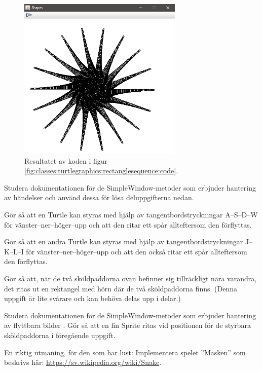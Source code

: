 \begin{figure}[H]
\centering
\includegraphics[width=0.7\textwidth, height = 0.3\pdfpageheight,keepaspectratio]{../img/w06-lab/RectangleSequence.png}
\caption {Resultatet av koden i figur \ref{fig:classes:turtlegraphics:rectanglesequence:code}.}
\label{fig:classes:turtlegraphics:rectanglesequence}

\end{figure}


\Task Studera dokumentationen för de SimpleWindow-metoder som erbjuder hantering av händelser  och använd dessa för lösa deluppgifterna nedan.

\Subtask Gör så att en Turtle kan styras med hjälp av tangentbordstryckningar A--S--D--W för vänster--ner--höger--upp och att den ritar ett spår allteftersom den förflyttas.

\Subtask Gör så att en andra Turtle kan styras med hjälp av tangentbordstryckningar J--K--L--I för vänster--ner--höger--upp och att den också ritar ett spår allteftersom den förflyttas.

\Subtask Gör så att, när de två sköldpaddorna ovan befinner sig tillräckligt nära varandra, det ritas ut en rektangel med hörn där de två sköldpaddorna finns. (Denna uppgift är lite svårare och kan behöva delas upp i delar.)


\Task Studera dokumentationen för de SimpleWindow-metoder som erbjuder hantering av flyttbara bilder . Gör så att en fin Sprite ritas vid positionen för de styrbara sköldpaddorna i föregående uppgift.

\Task En riktig utmaning, för den som har lust: Implementera spelet ''Masken'' som beskrivs här: \url{https://sv.wikipedia.org/wiki/Snake}.
